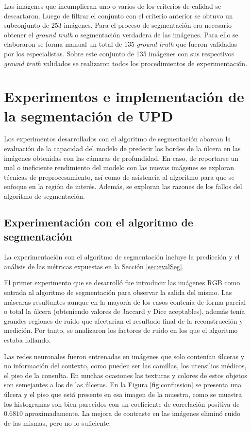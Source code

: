 Las imágenes que incumplieran uno o varios de los criterios de calidad se descartaron. Luego de filtrar el conjunto con el criterio anterior se obtuvo un subconjunto de 253 imágenes. Para el proceso de segmentación era necesario obtener el \textit{ground truth} o segmentación verdadera de las imágenes. Para ello se elaboraron se forma manual un total de 135 \textit{ground truth} que fueron validadas por los especialistas. Sobre este conjunto de 135 imágenes con sus respectivos \textit{ground truth} validados se realizaron todos los procedimientos de experimentación.

\section{Experimentos e implementación de la segmentación de UPD}

Los experimentos desarrollados con el algoritmo de segmentación abarcan la evaluación de la capacidad del modelo de predecir los bordes de la úlcera en las imágenes obtenidas con las cámaras de profundidad. En caso, de reportarse un mal o ineficiente rendimiento del modelo con las nuevas imágenes se exploran técnicas de preprocesamiento, así como de asistencia al algoritmo para que se enfoque en la región de interés. Además, se exploran las razones de los fallos del algoritmo de segmentación. 

\subsection{Experimentación con el algoritmo de segmentación}

La experimentación con el algoritmo de segmentación incluye la predicción y el análisis de las métricas expuestas en la Sección \ref{sec:evalSeg}. 

El primer experimento que se desarrolló fue introducir las imágenes RGB como entrada al algoritmo de segmentación para observar la salida del mismo. Las máscaras resultantes aunque en la mayoría de los casos contenía de forma parcial o total la úlcera (obteniendo valores de Jaccard y Dice aceptables), además tenía grandes regiones de ruido que afectarían el resultado final de la reconstrucción y medición. Por tanto, se analizaron los factores de ruido en los que el algoritmo estaba fallando. 

Las redes neuronales fueron entrenadas en imágenes que solo contenían úlceras y no información del contexto, como pueden ser las camillas, los utensilios médicos, el piso de la consulta. En muchas ocasiones las texturas y colores de estos objetos son semejantes a los de las úlceras. En la Figura \ref{fig:confussion} se presenta una úlcera y el piso que está presente en esa imagen de la muestra, como se muestra los histogramas son bien parecidos con un coeficiente de correlación positiva de $0.6810$ aproximadamente. La mejora de contraste en las imágenes eliminó ruido de las mismas, pero no lo suficiente.

